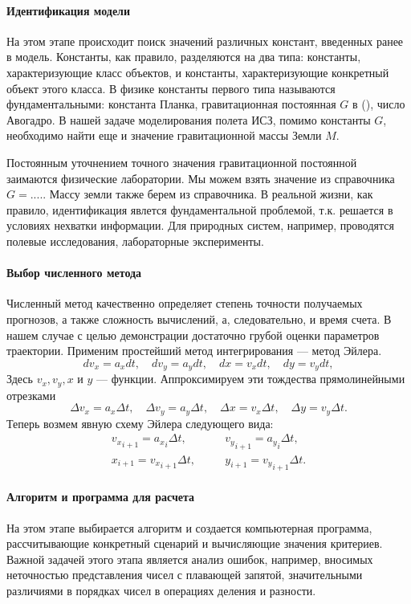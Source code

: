 \documentclass[12pt, openany, twoside]{book} %
\begin{document}
\paragraph{Идентификация модели} На этом этапе происходит поиск значений различных констант, введенных ранее в модель. Константы, как правило, разделяются на два типа: константы, характеризующие класс объектов, и константы, характеризующие конкретный объект этого класса. В физике константы первого типа называются фундаментальными: константа Планка, гравитационная постоянная $G$ в (\cite{newton}), число Авогадро. В нашей задаче моделирования полета ИСЗ, помимо константы $G$, необходимо найти еще и значение гравитационной массы Земли $M$. 

Постоянным уточнением точного значения гравитационной постоянной заимаются физические лаборатории. Мы можем взять значение из справочника $G=....$. Массу земли также берем из справочника. В реальной жизни, как правило, идентификация явлется фундаментальной проблемой, т.к. решается в условиях нехватки информации. Для природных систем, например, проводятся полевые исследования, лабораторные эксперименты.

\paragraph{Выбор численного метода} Численный метод качественно определяет степень точности получаемых прогнозов, а также сложность вычислений, а, следовательно, и время счета. В нашем случае с целью демонстрации достаточно грубой оценки параметров траектории. Применим простейший метод интегрирования --- метод Эйлера. 
\begin{equation}
dv_x=a_xdt, \quad dv_y=a_ydt, \quad dx=v_xdt, \quad dy=v_ydt,   
\nonumber
\end{equation}
Здесь $v_x, v_y, x$ и $y$ --- функции. Аппроксимируем эти тождества прямолинейными отрезками
\begin{equation}
\Delta v_x=a_x\Delta t, \quad \Delta v_y=a_y \Delta t, \quad \Delta x=v_x\Delta t, \quad \Delta y=v_y\Delta t.
\end{equation}
 Теперь возмем явную схему Эйлера следующего вида:
\begin{eqnarray}
{v_x}_{i+1} = {a_x}_i\Delta t, & \quad & {v_y}_{i+1} = {a_y}_i\Delta t, \\
{x}_{i+1} = {v_x}_{i+1}\Delta t, & \quad & {y}_{i+1} = {v_y}_{i+1}\Delta t.
\end{eqnarray}

\paragraph{Алгоритм и программа для расчета} На этом этапе выбирается алгоритм и создается компьютерная программа, рассчитывающие конкретный сценарий и вычисляющие значения критериев. Важной задачей этого этапа является анализ ошибок, например, вносимых неточностью представления чисел с плавающей запятой, значительными различиями в порядках чисел в операциях деления и разности.
\end{document}
